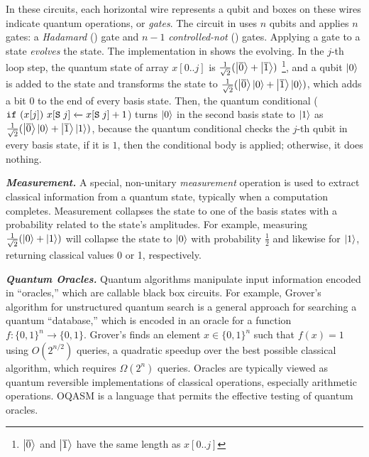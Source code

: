 In these circuits, each horizontal wire represents a qubit and boxes on these wires indicate quantum operations, or \emph{gates}. The circuit in  uses $n$ qubits and applies $n$ gates: a \emph{Hadamard} () gate and $n-1$ \emph{controlled-not} () gates.
Applying a gate to a state \emph{evolves} the state. 
The \qafny implementation in  shows the evolving. In the $j$-th loop step, the quantum state of array $x[0..j]$ is $\frac{1}{\sqrt{2}}(\left\vert{\overline{0}}\right\rangle+\left\vert{\overline{1}}\right\rangle)$ \footnote{$\left\vert{\overline{0}}\right\rangle$ and $\left\vert{\overline{1}}\right\rangle$ have the same length as $x[0..j]$}, and a qubit $\left\vert{0}\right\rangle$ is added to the state and transforms the state to $\frac{1}{\sqrt{2}}(\left\vert{\overline{0}}\right\rangle\left\vert{0}\right\rangle+\left\vert{\overline{1}}\right\rangle\left\vert{0}\right\rangle)$, which adds a bit $0$ to the end of every basis state. Then, the quantum conditional 
($\texttt{if}~{(x[j])}~{{x[\texttt{S}\;j]} \xleftarrow{} {x[\texttt{S}\;j]+1}}$) turns $\left\vert{0}\right\rangle$ in the second basis state to $\left\vert{1}\right\rangle$ as $\frac{1}{\sqrt{2}}(\left\vert{\overline{0}}\right\rangle\left\vert{0}\right\rangle+\left\vert{\overline{1}}\right\rangle\left\vert{1}\right\rangle)$, because the quantum conditional checks the $j$-th qubit in every basis state, if it is $1$, then the conditional body is applied; otherwise, it does nothing.

\noindent\textbf{\textit{Measurement.}} A special, non-unitary \emph{measurement} operation is used to extract classical information from a quantum state, typically when a computation completes. Measurement collapses the state to one of the basis states with a probability related to the state's amplitudes. For example, measuring $\frac{1}{\sqrt{2}}(\left\vert{0}\right\rangle + \left\vert{1}\right\rangle)$ will collapse the state to $\left\vert{0}\right\rangle$ with probability $\frac{1}{2}$ and likewise for $\left\vert{1}\right\rangle$, returning classical values 0 or 1, respectively.

\noindent\textbf{\textit{Quantum Oracles.}} Quantum algorithms manipulate input information encoded in ``oracles,'' which are callable black box circuits. For example, Grover's algorithm for unstructured quantum search \cite{grover1996,grover1997} is a general approach for searching a quantum ``database,'' which is encoded in an oracle for a function $f : \{0, 1\}^n \to \{0, 1\}$. Grover's finds an element $x \in \{0, 1\}^n$ such that $f(x) = 1$ using $O(2^{n/2})$ queries, a quadratic speedup over the best possible classical algorithm, which requires $\Omega(2^n)$ queries. Oracles are typically viewed as quantum reversible implementations of classical operations, especially arithmetic operations. OQASM \cite{oracleoopsla} is a language that permits the effective testing of quantum oracles.









